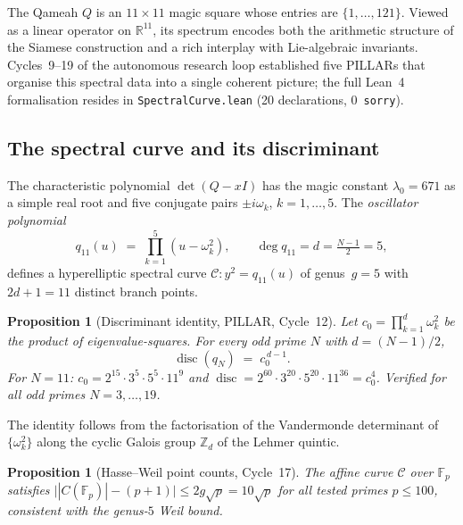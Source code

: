 \documentclass[aps,prd,twocolumn,superscriptaddress,floatfix,nofootinbib]{revtex4-2}
\newtheorem{proposition}[theorem]{Proposition}
\theoremstyle{definition}
\theoremstyle{remark}
\begin{document}
The Qameah $Q$ is an $11\times 11$ magic square whose entries are
$\{1,\ldots,121\}$.  Viewed as a linear operator on $\mathbb{R}^{11}$,
its spectrum encodes both the arithmetic structure of the Siamese
construction and a rich interplay with Lie-algebraic invariants.
Cycles~9--19 of the autonomous research loop established five PILLARs
that organise this spectral data into a single coherent picture;
the full Lean~4 formalisation resides in
\texttt{SpectralCurve.lean} (20 declarations, 0~\texttt{sorry}).

\subsection{The spectral curve and its discriminant}
\label{sec:spectral-curve}

The characteristic polynomial $\det(Q-xI)$ has the magic constant
$\lambda_0=671$ as a simple real root and five conjugate pairs
$\pm i\omega_k$, $k=1,\ldots,5$.  The \emph{oscillator polynomial}
\[
  q_{11}(u) \;=\; \prod_{k=1}^{5}(u - \omega_k^2),
  \qquad \deg q_{11} = d = \tfrac{N-1}{2} = 5,
\]
defines a hyperelliptic spectral curve
$\mathcal{C}\colon y^2 = q_{11}(u)$ of genus~$g=5$
with $2d+1=11$ distinct branch points.

\begin{proposition}[Discriminant identity, PILLAR, Cycle~12]
\label{prop:disc-identity}
Let $c_0 = \prod_{k=1}^{d}\omega_k^2$ be the product of eigenvalue-squares.
For every odd prime $N$ with $d=(N-1)/2$,
\[
  \operatorname{disc}(q_N) \;=\; c_0^{\,d-1}.
\]
For $N=11$: $c_0 = 2^{15}\cdot 3^5\cdot 5^5\cdot 11^9$ and
$\operatorname{disc} = 2^{60}\cdot 3^{20}\cdot 5^{20}\cdot 11^{36}
= c_0^4$.  Verified for all odd primes $N=3,\ldots,19$.
\end{proposition}

The identity follows from the factorisation of the Vandermonde
determinant of $\{\omega_k^2\}$ along the cyclic Galois group
$\mathbb{Z}_d$ of the Lehmer quintic.

\begin{proposition}[Hasse--Weil point counts, Cycle~17]
\label{prop:hasse-weil}
The affine curve $\mathcal{C}$ over $\mathbb{F}_p$ satisfies
$\bigl||C(\mathbb{F}_p)| - (p+1)\bigr| \le 2g\sqrt{p} = 10\sqrt{p}$
for all tested primes $p \le 100$, consistent with the genus-$5$ Weil bound.
\end{proposition}
\end{document}
